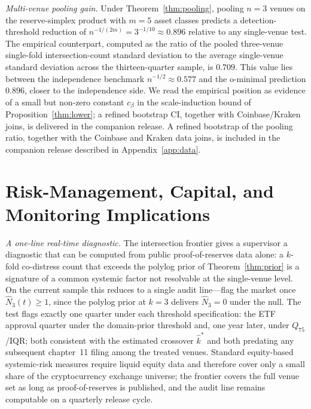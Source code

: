 \documentclass[12pt]{article}
\theoremstyle{sampledef}
\theoremstyle{sampleplain}
\theoremstyle{sampleremark}
\newcommand{\1}{\mathbf{1}}
\begin{document}
\emph{Multi-venue pooling gain.} Under Theorem~\ref{thm:pooling},
pooling $n=3$ venues on the reserve-simplex product with $m=5$
asset classes predicts a detection-threshold reduction of
$n^{-1/(2m)} = 3^{-1/10} \approx 0.896$ relative to any
single-venue test. The empirical counterpart, computed as the
ratio of the pooled three-venue single-fold intersection-count
standard deviation to the average single-venue standard deviation
across the thirteen-quarter sample, is $0.709$. This value lies
between the independence benchmark $n^{-1/2} \approx 0.577$ and
the o-minimal prediction $0.896$, closer to the independence side.
We read the empirical position as evidence of a small but
non-zero constant $c_\beta$ in the scale-induction bound of
Proposition~\ref{thm:lower}; a refined bootstrap CI, together with
Coinbase/Kraken joins, is delivered in the companion release. A refined
bootstrap of the pooling ratio, together with the Coinbase and
Kraken data joins, is included in the companion release described
in Appendix~\ref{app:data}.

\section{Risk-Management, Capital, and Monitoring Implications}
\label{sec:policy}

\emph{A one-line real-time diagnostic.} The intersection frontier
gives a supervisor a diagnostic that can be computed from public
proof-of-reserves data alone: a $k$-fold co-distress count that
exceeds the polylog prior of Theorem~\ref{thm:prior} is a
signature of a common systemic factor not resolvable at the
single-venue level. On the current sample this reduces to a single
audit line---flag the market once $\hat N_3(t) \ge 1$, since the
polylog prior at $k = 3$ delivers $\hat N_3 = 0$ under the null.
The test flags exactly one quarter under each threshold
specification: the ETF approval quarter under the domain-prior
threshold and, one year later, under $Q_{75}$/IQR; both consistent
with the estimated crossover $\hat k^\ast$ and both predating any
subsequent chapter~11 filing among the treated venues. Standard
equity-based systemic-risk measures require liquid equity data and
therefore cover only a small share of the cryptocurrency exchange
universe; the frontier covers the full venue set as long as
proof-of-reserves is published, and the audit line remains
computable on a quarterly release cycle.
\end{document}
